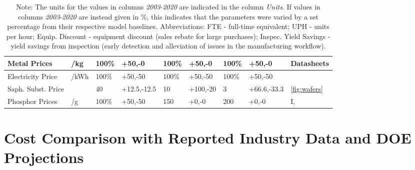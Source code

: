 \documentclass[parskip=full]{article}
\begin{document}
\begin{table}[]
\begin{NiceTabularX}{\textwidth}{ |X|X|l|l|l|l|l|l|X|}
        \hline
            Metal Prices & /kg & 100\% & +50,-0 & 100\% & +50,-0 & 100\% & +50,-0 & Datasheets \\
        \hline
            Electricity Price & /kWh & 100\% & +50,-50 & 100\% & +50,-50 & 100\% & +50,-50 & \cite{eia2000electric}\cite{eia2019electric} \\
        \hline
            Saph. Subst. Price &  & 40 & +12.5,-12.5 & 10 & +100,-20 & 3 & +66.6,-33.3 & \cref{fig:wafers} \\
        \hline
            Phosphor Prices & /g & 100\% & +50,-50 & 150 & +0,-0 & 200 & +0,-0 & I, \cite{yole_phosphor_2012}\cite{yole2017phosphor} \\
        \hline
        \end{NiceTabularX}
    \caption*{Note: The units for the values in columns \textit{2003}-\textit{2020} are indicated in the column \textit{Units}. If values in columns \textit{2003}-\textit{2020} are instead given in \%, this indicates that the parameters were varied by a set percentage from their respective model baselines. Abbreviations: FTE - full-time equivalent; UPH - units per hour; Equip. Discount - equipment discount (sales rebate for large purchases); Inspec. Yield Savings - yield savings from inspection (early detection and alleviation of issues in the manufacturing workflow).}
    \label{tab:sensitivity}
\end{table}


\clearpage
\section{Cost Comparison with Reported Industry Data and DOE Projections}
\end{document}
